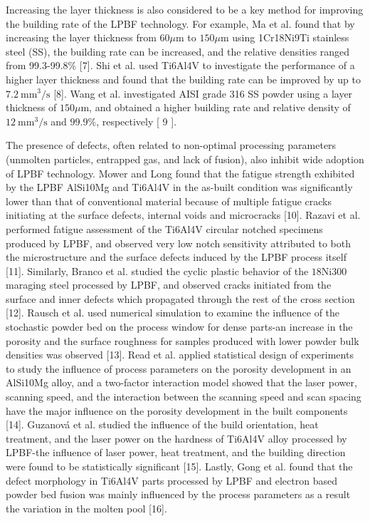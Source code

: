 \documentclass[10pt]{article}
\begin{document}
Increasing the layer thickness is also considered to be a key method for improving the building rate of the LPBF technology. For example, Ma et al. found that by increasing the layer thickness from $60 \mu \mathrm{m}$ to $150 \mu \mathrm{m}$ using 1Cr18Ni9Ti stainless steel (SS), the building rate can be increased, and the relative densities ranged from 99.3-99.8\% [7]. Shi et al. used Ti6Al4V to investigate the performance of a higher layer thickness and found that the building rate can be improved by up to $7.2 \mathrm{~mm}^{3} / \mathrm{s}$ [8]. Wang et al. investigated AISI grade 316 SS powder using a layer thickness of $150 \mu \mathrm{m}$, and obtained a higher building rate and relative density of $12 \mathrm{~mm}^{3} / \mathrm{s}$ and $99.9 \%$, respectively [ 9 ].

The presence of defects, often related to non-optimal processing parameters (unmolten particles, entrapped gas, and lack of fusion), also inhibit wide adoption of LPBF technology. Mower and Long found that the fatigue strength exhibited by the LPBF AlSi10Mg and Ti6Al4V in the as-built condition was significantly lower than that of conventional material because of multiple fatigue cracks initiating at the surface defects, internal voids and microcracks [10]. Razavi et al. performed fatigue assessment of the Ti6Al4V circular notched specimens produced by LPBF, and observed very low notch sensitivity attributed to both the microstructure and the surface defects induced by the LPBF process itself [11]. Similarly, Branco et al. studied the cyclic plastic behavior of the $18 \mathrm{Ni} 300$ maraging steel processed by LPBF, and observed cracks initiated from the surface and inner defects which propagated through the rest of the cross section [12]. Rausch et al. used numerical simulation to examine the influence of the stochastic powder bed on the process window for dense parts-an increase in the porosity and the surface roughness for samples produced with lower powder bulk densities was observed [13]. Read et al. applied statistical design of experiments to study the influence of process parameters on the porosity development in an AlSi10Mg alloy, and a two-factor interaction model showed that the laser power, scanning speed, and the interaction between the scanning speed and scan spacing have the major influence on the porosity development in the built components [14]. Guzanová et al. studied the influence of the build orientation, heat treatment, and the laser power on the hardness of Ti6Al4V alloy processed by LPBF-the influence of laser power, heat treatment, and the building direction were found to be statistically significant [15]. Lastly, Gong et al. found that the defect morphology in Ti6Al4V parts processed by LPBF and electron based powder bed fusion was mainly influenced by the process parameters as a result the variation in the molten pool [16].
\end{document}
